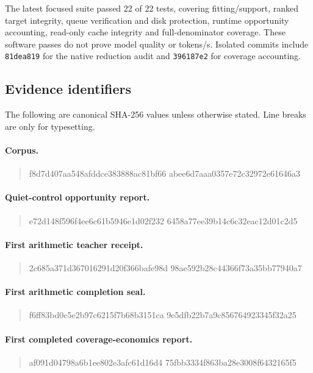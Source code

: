 The latest focused suite passed 22 of 22 tests, covering fitting/support,
ranked target integrity, queue verification and disk protection, runtime
opportunity accounting, read-only cache integrity and full-denominator
coverage. These software passes do not prove model quality or tokens/s.
Isolated commits include \texttt{81dea819} for the native reduction audit and
\texttt{396187e2} for coverage accounting.

\subsection{Evidence identifiers}
The following are canonical SHA-256 values unless otherwise stated.
Line breaks are only for typesetting.
\paragraph{Corpus.}
\begin{quote}\ttfamily\small
f8d7d407aa548afddce383888ac81bf66\allowbreak
abee6d7aaa0357e72c32972e61646a3
\end{quote}
\paragraph{Quiet-control opportunity report.}
\begin{quote}\ttfamily\small
e72d148f596f4ee6c61b5946e1d02f232\allowbreak
6458a77ee39b14c6c32eac12d01c2d5
\end{quote}
\paragraph{First arithmetic teacher receipt.}
\begin{quote}\ttfamily\small
2c685a371d367016291d20f366bafe98d\allowbreak
98ae592b28c44366f73a35bb77940a7
\end{quote}
\paragraph{First arithmetic completion seal.}
\begin{quote}\ttfamily\small
f6ff83bd0c5e2b97c6215f7b68b3151ca\allowbreak
9e5dfb22b7a9c856764923345f32a25
\end{quote}
\paragraph{First completed coverage-economics report.}
\begin{quote}\ttfamily\small
af091d04798a6b1ee802e3afc61d16d4\allowbreak
75fbb3334f863ba28e3008f6432165f5
\end{quote}

